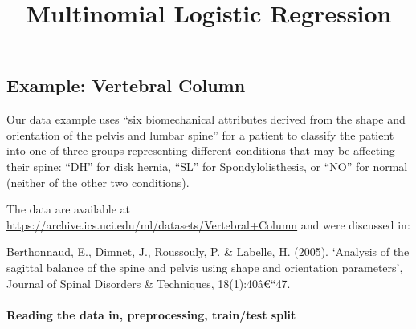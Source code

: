 \documentclass[]{article}
\title{Multinomial Logistic Regression}
\author{}
\date{}
\let\oldparagraph\paragraph
\renewcommand{\paragraph}[1]{\oldparagraph{#1}\mbox{}}
\begin{document}
\maketitle

\hypertarget{example-vertebral-column}{%
\subsection{Example: Vertebral Column}\label{example-vertebral-column}}

Our data example uses ``six biomechanical attributes derived from the
shape and orientation of the pelvis and lumbar spine'' for a patient to
classify the patient into one of three groups representing different
conditions that may be affecting their spine: ``DH'' for disk hernia,
``SL'' for Spondylolisthesis, or ``NO'' for normal (neither of the other
two conditions).

The data are available at
\url{https://archive.ics.uci.edu/ml/datasets/Vertebral+Column} and were
discussed in:

Berthonnaud, E., Dimnet, J., Roussouly, P. \& Labelle, H. (2005).
`Analysis of the sagittal balance of the spine and pelvis using shape
and orientation parameters', Journal of Spinal Disorders \& Techniques,
18(1):40â€``47.

\hypertarget{reading-the-data-in-preprocessing-traintest-split}{%
\paragraph{Reading the data in, preprocessing, train/test
split}\label{reading-the-data-in-preprocessing-traintest-split}}
\end{document}
